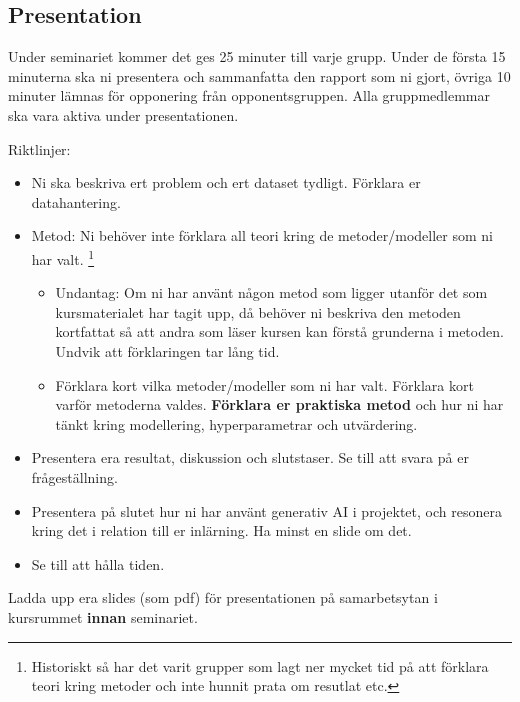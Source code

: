 \documentclass[a4paper]{article}
\begin{document}
\subsection*{Presentation}
Under seminariet kommer det ges 25 minuter till varje grupp. Under de första 15 
minuterna ska ni presentera och sammanfatta den rapport som ni gjort, övriga 10 
minuter lämnas för opponering från opponentsgruppen. Alla gruppmedlemmar ska vara aktiva under presentationen.

Riktlinjer:
\begin{itemize}
    \item Ni ska beskriva ert problem och ert dataset tydligt. Förklara er datahantering.
    \item Metod: Ni behöver inte förklara all teori kring de metoder/modeller som ni har valt.
    \footnote{Historiskt så har det varit grupper som lagt ner mycket tid på att förklara teori kring metoder och inte hunnit prata om resutlat etc.}
    \begin{itemize}
        \item Undantag: Om ni har använt någon metod som ligger utanför det som 
        kursmaterialet har tagit upp, då behöver ni beskriva den metoden kortfattat så
        att andra som läser kursen kan förstå grunderna i metoden. Undvik att förklaringen tar lång tid.
        \item Förklara kort vilka metoder/modeller som ni har valt. Förklara kort varför metoderna valdes. \textbf{Förklara er
        praktiska metod} och hur ni har tänkt kring modellering, hyperparametrar och utvärdering.
        \end{itemize}
    \item Presentera era resultat, diskussion och slutstaser. Se till att svara på er frågeställning.
    \item Presentera på slutet hur ni har använt generativ AI i projektet, och resonera kring det i relation till er inlärning. Ha minst en slide om det.
    \item Se till att hålla tiden.
\end{itemize}

Ladda upp era slides (som pdf) för presentationen på samarbetsytan i kursrummet \textbf{innan} seminariet.
\end{document}
